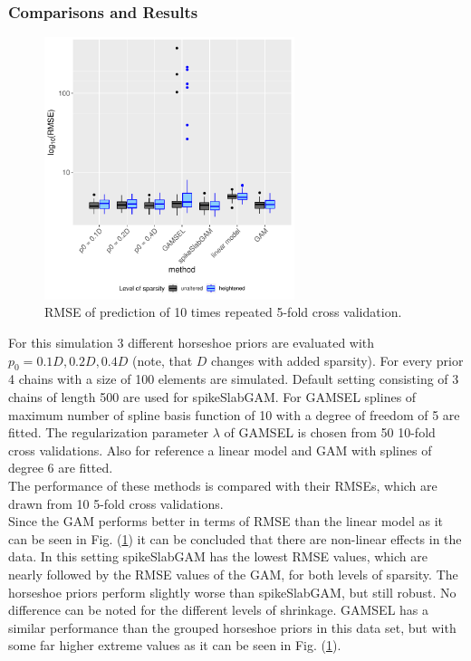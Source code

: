 \documentclass[12pt,letterpaper]{article}
\numberwithin{equation}{subsection}
\begin{document}
\subsubsection{Comparisons and Results}
\label{sec:bncs}
\begin{figure}[hbt!]
 \centering
 \includegraphics[width=0.65\textwidth]{../plots/bn-mse.pdf}
 \caption[RMSE of prediction (Boston housing)]{RMSE of prediction of 10 times repeated 5-fold cross validation.}
 \label{fig:bn-mse}
\end{figure}
For this simulation 3 different horseshoe priors are evaluated with $p_0 = 0.1D, 0.2D, 0.4D$ (note, that $D$ changes with added sparsity).  For every prior 4 chains with a size of 100 elements are simulated. Default setting consisting of 3 chains of length 500 are used for spikeSlabGAM. For GAMSEL splines of maximum number of spline basis function of 10 with a degree of freedom of 5 are fitted. The regularization parameter $\lambda$ of GAMSEL is chosen from 50 10-fold cross validations. Also for reference a linear model and GAM with splines of degree 6 are fitted.  \\
The performance of these methods is compared with their RMSEs, which are drawn from 10 5-fold cross validations. \\
Since the GAM performs better in terms of RMSE than the linear model as it can be seen in Fig. (\ref{fig:bn-mse}) it can be concluded that there are non-linear effects in the data. In this setting spikeSlabGAM has the lowest RMSE values, which are nearly followed by the RMSE values of the GAM, for both levels of sparsity. The horseshoe priors perform slightly worse than spikeSlabGAM, but still robust. No difference can be noted for the different levels of shrinkage. GAMSEL has a similar performance than the grouped horseshoe priors in this data set, but with some far higher extreme values as it can be seen in Fig. (\ref{fig:bn-mse}).
\FloatBarrier
\end{document}

